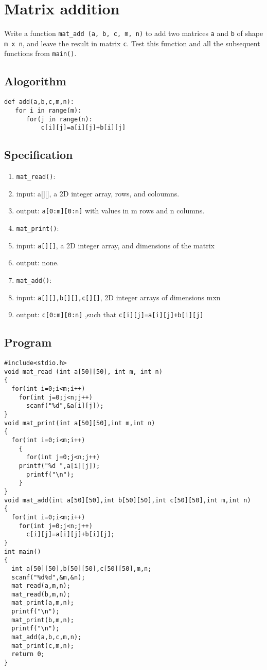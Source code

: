 \documentclass[11pt]{article}
\begin{document}
\linespread{1.2}
\section{Matrix addition}
\label{sec-4}

Write a function \texttt{mat\_add (a, b, c, m, n)} to add two
matrices \texttt{a} and \texttt{b} of shape \texttt{m x n}, and leave the
result in matrix \texttt{c}. Test this function and all the
subsequent functions from \texttt{main()}.
\linespread{1}
\linespread{1.2}
\subsection*{Alogorithm}
\label{sec-4-1}
\begin{verbatim}
def add(a,b,c,m,n):
   for i in range(m):
      for(j in range(n):
          c[i][j]=a[i][j]+b[i][j]
\end{verbatim}
\subsection*{Specification}
\label{sec-4-2}
\begin{enumerate}
\item \texttt{mat\_read()}:
\item input: a[][], a 2D integer array, rows, and coloumns.
\item output: \texttt{a[0:m][0:n]} with values in m rows and n columns.
\item \texttt{mat\_print()}:
\item input: \texttt{a[][]}, a 2D integer array, and dimensions of the matrix
\item output: none.
\item \texttt{mat\_add()}:
\item input: \texttt{a[][],b[][],c[][]}, 2D integer arrays of dimensions mxn
\item output: \texttt{c[0:m][0:n]} ,such that \texttt{c[i][j]=a[i][j]+b[i][j]}
\end{enumerate}
\subsection*{Program}
\label{sec-4-3}
\begin{verbatim}
#include<stdio.h>
void mat_read (int a[50][50], int m, int n)
{
  for(int i=0;i<m;i++)
    for(int j=0;j<n;j++)
      scanf("%d",&a[i][j]);
}
void mat_print(int a[50][50],int m,int n)
{
  for(int i=0;i<m;i++)
    {
      for(int j=0;j<n;j++)
	printf("%d ",a[i][j]);
      printf("\n");
    }
}
void mat_add(int a[50][50],int b[50][50],int c[50][50],int m,int n)
{
  for(int i=0;i<m;i++)
    for(int j=0;j<n;j++)
      c[i][j]=a[i][j]+b[i][j];
}
int main()
{
  int a[50][50],b[50][50],c[50][50],m,n;
  scanf("%d%d",&m,&n);
  mat_read(a,m,n);
  mat_read(b,m,n);
  mat_print(a,m,n);
  printf("\n");
  mat_print(b,m,n);
  printf("\n");
  mat_add(a,b,c,m,n);
  mat_print(c,m,n);
  return 0;
}
\end{verbatim}
\end{document}
